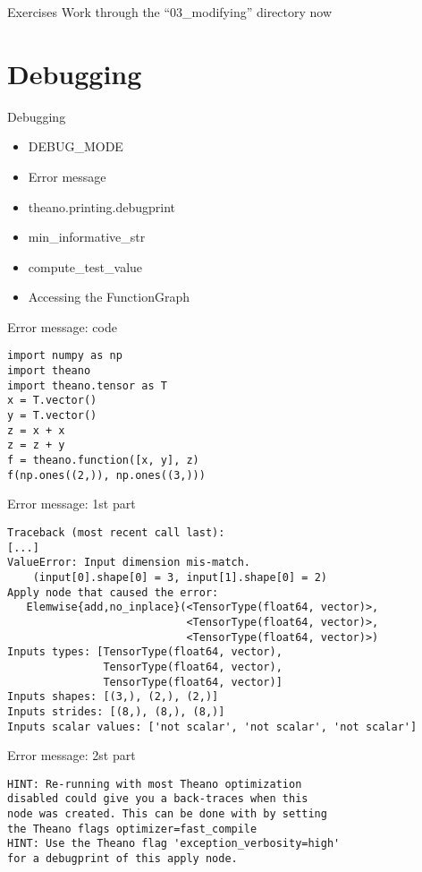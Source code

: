 \documentclass[utf8x]{beamer}
\begin{document}
\begin{frame}{Exercises}
Work through the ``03\_modifying'' directory now
\end{frame}

\section{Debugging}
\begin{frame}{Debugging}
  \begin{itemize}
  \item DEBUG\_MODE
  \item Error message
  \item theano.printing.debugprint
  \item min\_informative\_str
  \item compute\_test\_value
  \item Accessing the FunctionGraph
  \end{itemize}
\end{frame}

\begin{frame}[fragile]{Error message: code}
\begin{lstlisting}
import numpy as np
import theano
import theano.tensor as T
x = T.vector()
y = T.vector()
z = x + x
z = z + y
f = theano.function([x, y], z)
f(np.ones((2,)), np.ones((3,)))
\end{lstlisting}
\end{frame}

\begin{frame}[fragile]{Error message: 1st part}

\begin{lstlisting}
Traceback (most recent call last):
[...]
ValueError: Input dimension mis-match.
    (input[0].shape[0] = 3, input[1].shape[0] = 2)
Apply node that caused the error:
   Elemwise{add,no_inplace}(<TensorType(float64, vector)>,
                            <TensorType(float64, vector)>,
                            <TensorType(float64, vector)>)
Inputs types: [TensorType(float64, vector),
               TensorType(float64, vector),
               TensorType(float64, vector)]
Inputs shapes: [(3,), (2,), (2,)]
Inputs strides: [(8,), (8,), (8,)]
Inputs scalar values: ['not scalar', 'not scalar', 'not scalar']
\end{lstlisting}
\end{frame}

\begin{frame}[fragile]{Error message: 2st part}
\begin{lstlisting}
HINT: Re-running with most Theano optimization
disabled could give you a back-traces when this
node was created. This can be done with by setting
the Theano flags optimizer=fast_compile
HINT: Use the Theano flag 'exception_verbosity=high'
for a debugprint of this apply node.
\end{lstlisting}
\end{frame}
\end{document}

